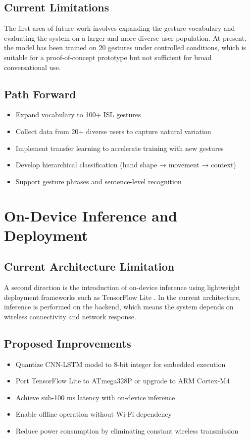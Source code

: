 \documentclass[12pt,a4paper]{report}
\begin{document}
\subsection{Current Limitations}
The first area of future work involves expanding the gesture vocabulary and evaluating the system on a larger and more diverse user population. At present, the model has been trained on 20 gestures under controlled conditions, which is suitable for a proof-of-concept prototype but not sufficient for broad conversational use.

\subsection{Path Forward}
\begin{itemize}
  \item Expand vocabulary to 100+ ISL gestures
  \item Collect data from 20+ diverse users to capture natural variation
  \item Implement transfer learning to accelerate training with new gestures
  \item Develop hierarchical classification (hand shape → movement → context)
  \item Support gesture phrases and sentence-level recognition
\end{itemize}

\section{On-Device Inference and Deployment}
\label{sec:future_ondevice}

\subsection{Current Architecture Limitation}
A second direction is the introduction of on-device inference using lightweight deployment frameworks such as TensorFlow Lite \cite{tensorflow}. In the current architecture, inference is performed on the backend, which means the system depends on wireless connectivity and network response.

\subsection{Proposed Improvements}
\begin{itemize}
  \item Quantize CNN-LSTM model to 8-bit integer for embedded execution
  \item Port TensorFlow Lite to ATmega328P or upgrade to ARM Cortex-M4
  \item Achieve sub-100 ms latency with on-device inference
  \item Enable offline operation without Wi-Fi dependency
  \item Reduce power consumption by eliminating constant wireless transmission
\end{itemize}
\end{document}
